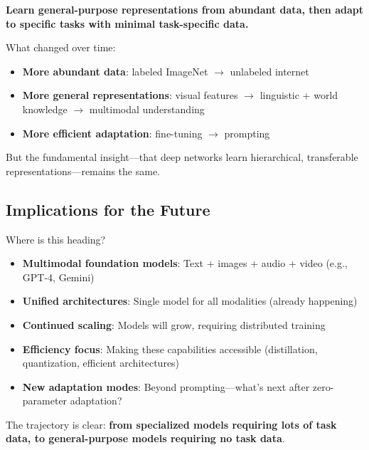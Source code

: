 \documentclass{article}
\begin{document}
\begin{tcolorbox}[colback=green!5!white, colframe=green!50!black, title=The Universal Law of Transfer Learning]
\textbf{Learn general-purpose representations from abundant data, then adapt to specific tasks with minimal task-specific data.}

What changed over time:
\begin{itemize}
\item \textbf{More abundant data}: labeled ImageNet $\rightarrow$ unlabeled internet
\item \textbf{More general representations}: visual features $\rightarrow$ linguistic + world knowledge $\rightarrow$ multimodal understanding
\item \textbf{More efficient adaptation}: fine-tuning $\rightarrow$ prompting
\end{itemize}

But the fundamental insight---that deep networks learn hierarchical, transferable representations---remains the same.
\end{tcolorbox}

\subsection{Implications for the Future}

Where is this heading?

\begin{itemize}
\item \textbf{Multimodal foundation models}: Text + images + audio + video (e.g., GPT-4, Gemini)

\item \textbf{Unified architectures}: Single model for all modalities (already happening)

\item \textbf{Continued scaling}: Models will grow, requiring distributed training

\item \textbf{Efficiency focus}: Making these capabilities accessible (distillation, quantization, efficient architectures)

\item \textbf{New adaptation modes}: Beyond prompting---what's next after zero-parameter adaptation?
\end{itemize}

The trajectory is clear: \textbf{from specialized models requiring lots of task data, to general-purpose models requiring no task data}.
\end{document}
